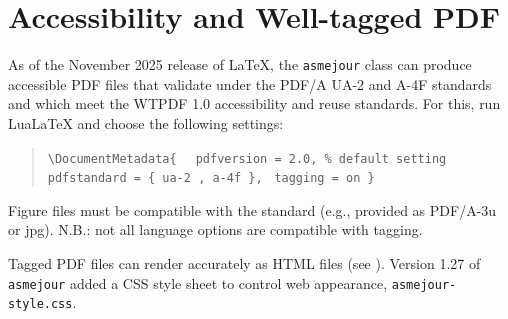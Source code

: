 \documentclass[balance,nocopyright,upint,varvw,hyphenate,barcolor=Goldenrod3,german]{asmejour}%
\newcommand*\LuaLaTeX{Lua\LaTeX}
\begin{document}

\section{Accessibility and Well-tagged PDF}\label{app:wtpdf}
As of the November 2025 release of \LaTeX, the \texttt{asmejour} class can produce accessible PDF files that validate under 
the PDF/A UA-2 and A-4F standards and which meet the WTPDF 1.0 accessibility and reuse standards. For this, run \LuaLaTeX{} and choose the following settings: 
 \begin{quote}
	\verb|\DocumentMetadata{ | \newline
	\verb| pdfversion = 2.0, % default setting | \newline
	\verb| pdfstandard = { ua-2 , a-4f },| \newline
	\verb| tagging = on }|
\end{quote}
Figure files must be compatible with the standard (e.g., provided as PDF/A-3u or jpg). N.B.: not all language options are compatible with tagging.

Tagged PDF files can render accurately as HTML files (see ). Version 1.27 of \texttt{asmejour} added a CSS style sheet to control web appearance, \texttt{asmejour-style.css}. 


\nocite{*} %




\end{document}
